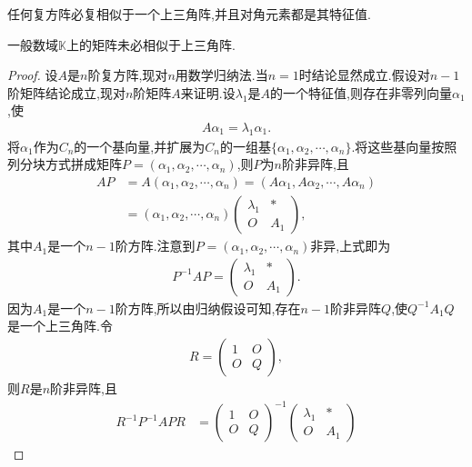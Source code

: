 \documentclass[../../main.tex]{subfiles}%
\begin{document}
\begin{theorem}[复方阵必相似于上三角阵]\label{theorem:复方阵必相似于上三角阵}
任何复方阵必复相似于一个上三角阵,并且对角元素都是其特征值.
\end{theorem}
\begin{remark}
一般数域$\mathbb{K}$上的矩阵未必相似于上三角阵.
\end{remark}
\begin{proof}

设$A$是$n$阶复方阵,现对$n$用数学归纳法.当$n=1$时结论显然成立.假设对$n-1$阶矩阵结论成立,现对$n$阶矩阵$A$来证明.设$\lambda_1$是$A$的一个特征值,则存在非零列向量$\alpha_1$,使
\begin{align*}
A \alpha_1 = \lambda_1 \alpha_1.
\end{align*}
将$\alpha_1$作为$C_n$的一个基向量,并扩展为$C_n$的一组基$\{\alpha_1, \alpha_2, \cdots, \alpha_n\}$.将这些基向量按照列分块方式拼成矩阵$P = (\alpha_1, \alpha_2, \cdots, \alpha_n)$,则$P$为$n$阶非异阵,且
\begin{align*}
AP &= A(\alpha_1, \alpha_2, \cdots, \alpha_n) = (A\alpha_1, A\alpha_2, \cdots, A\alpha_n) \\
&= (\alpha_1, \alpha_2, \cdots, \alpha_n) \begin{pmatrix}
\lambda_1 & * \\
O & A_1
\end{pmatrix},
\end{align*}
其中$A_1$是一个$n-1$阶方阵.注意到$P = (\alpha_1, \alpha_2, \cdots, \alpha_n)$非异,上式即为
\begin{align*}
P^{-1}AP = \begin{pmatrix}
\lambda_1 & * \\
O & A_1
\end{pmatrix}.
\end{align*}
因为$A_1$是一个$n-1$阶方阵,所以由归纳假设可知,存在$n-1$阶非异阵$Q$,使$Q^{-1}A_1Q$是一个上三角阵.令
\begin{align*}
R = \begin{pmatrix}
1 & O \\
O & Q
\end{pmatrix},
\end{align*}
则$R$是$n$阶非异阵,且
\begin{align*}
R^{-1}P^{-1}APR &= \begin{pmatrix}
1 & O \\
O & Q
\end{pmatrix}^{-1} \begin{pmatrix}
\lambda_1 & * \\
O & A_1

\end{pmatrix}
\end{align*}
\end{proof}
\end{document}
